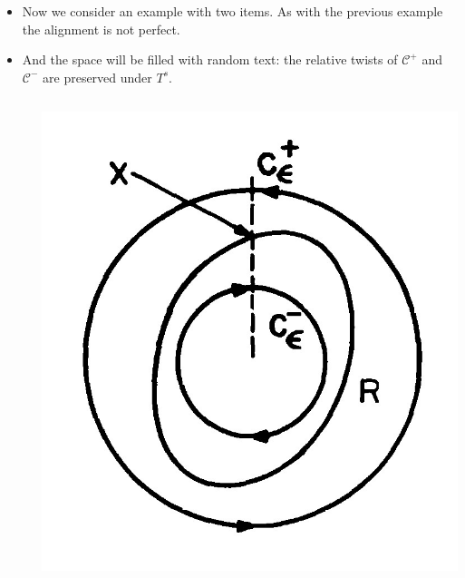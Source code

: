 \documentclass[a4,compress]{beamer}
\theoremstyle{plain}
\theoremstyle{definition}
\begin{document}
\begin{frame}
  \begin{itemize}
    \item Now we consider an example with two items. As with the previous example the alignment is not perfect.
    \item And the space will be filled with random text: 
    the relative twists of \(\mathcal{C}^+\) and \(\mathcal{C}^-\) are preserved
    under \(T^s\).

    \begin{columns}[T, onlytextwidth]
      \begin{column}{0.05\textwidth}

      \end{column}
      \begin{column}{0.3\textwidth}
        \includegraphics[width=\textwidth]{invariant-curves-perturbed}
      \end{column}
    \end{columns}
  \end{itemize}
\end{frame}
\end{document}
